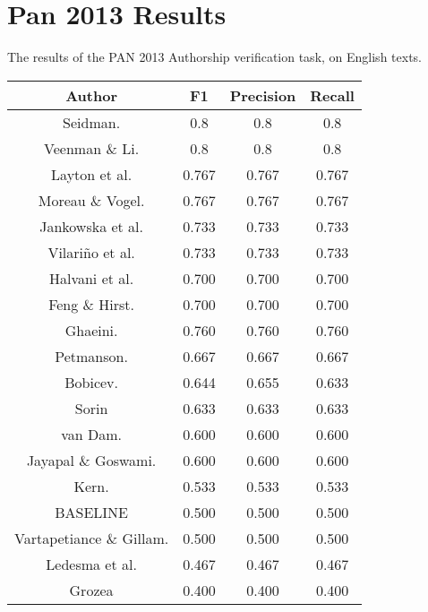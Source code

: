 \section{Pan 2013 Results} \label{sec:appendix:pan_2013_results}
The results of the PAN 2013 Authorship verification task, on English texts.

\begin{center}
\begin{tabular}{|c|c|c|c|}
\hline
\textbf{Author}          & \textbf{F1} & \textbf{Precision} & \textbf{Recall} \\ \hline
Seidman.                 & 0.8         & 0.8                & 0.8             \\ \hline
Veenman \& Li.           & 0.8         & 0.8                & 0.8             \\ \hline
Layton et al.            & 0.767       & 0.767              & 0.767           \\ \hline
Moreau \& Vogel.         & 0.767       & 0.767              & 0.767           \\ \hline
Jankowska et al.         & 0.733       & 0.733              & 0.733           \\ \hline
Vilariño et al.          & 0.733       & 0.733              & 0.733           \\ \hline
Halvani et al.           & 0.700       & 0.700              & 0.700           \\ \hline
Feng \& Hirst.           & 0.700       & 0.700              & 0.700           \\ \hline
Ghaeini.                 & 0.760       & 0.760              & 0.760           \\ \hline
Petmanson.               & 0.667       & 0.667              & 0.667           \\ \hline
Bobicev.                 & 0.644       & 0.655              & 0.633           \\ \hline
Sorin                    & 0.633       & 0.633              & 0.633           \\ \hline
van Dam.                 & 0.600       & 0.600              & 0.600           \\ \hline
Jayapal \& Goswami.      & 0.600       & 0.600              & 0.600           \\ \hline
Kern.                    & 0.533       & 0.533              & 0.533           \\ \hline
BASELINE                 & 0.500       & 0.500              & 0.500           \\ \hline
Vartapetiance \& Gillam. & 0.500       & 0.500              & 0.500           \\ \hline
Ledesma et al.           & 0.467       & 0.467              & 0.467           \\ \hline
Grozea                   & 0.400       & 0.400              & 0.400           \\ \hline
\end{tabular}
\end{center}

